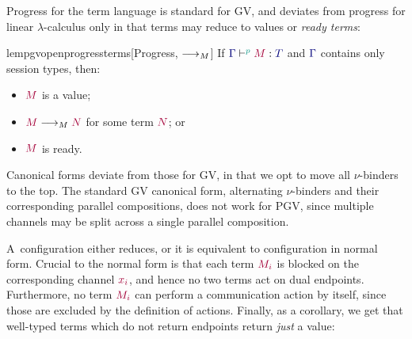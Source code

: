 \documentclass[main.tex]{subfiles}
\begin{document}
Progress for the term language is standard for GV, and deviates from progress for linear $\lambda$-calculus only in that terms may reduce to values or \emph{ready terms}:
\begin{restatablelemma}{lempgvopenprogressterms}[Progress, $\longrightarrow_{M}$]
  \label{lem:pgv-open-progress-terms}
  If $\tseq[\cs{p}]{\ty{\Gamma}}{M}{T}$ and $\ty{\Gamma}$ contains only session types, then:
  \begin{itemize}
  \item $\tm{M}$ is a value;
  \item $\tm{M}\tred\tm{N}$ for some term $\tm{N}$; or
  \item $\tm{M}$ is ready.
  \end{itemize}
\end{restatablelemma}

Canonical forms deviate from those for GV, in that we opt to move all $\nu$-binders to the top. The standard GV canonical form, alternating $\nu$-binders and their corresponding parallel compositions, does not work for PGV, since multiple channels may be split across a single parallel composition.

A~configuration either reduces, or it is equivalent to configuration in normal form. Crucial to the normal form is that each term $\tm{M_i}$ is blocked on the corresponding channel $\tm{x_i}$, and hence no two terms act on dual endpoints. Furthermore, no term $\tm{M_i}$ can perform a communication action by itself, since those are excluded by the definition of actions.
Finally, as a corollary, we get that well-typed terms which do not return endpoints return \emph{just} a value:
\end{document}
